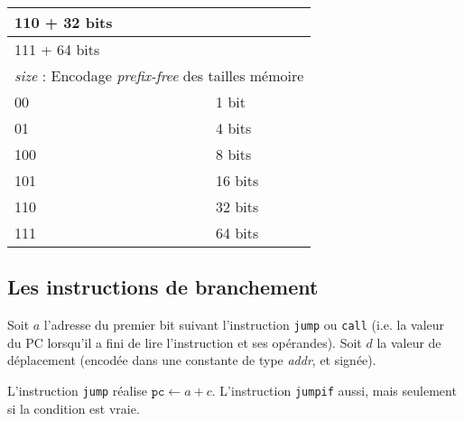 \documentclass[architecture]{compas2018}
\begin{document}
\begin{table}
\begin{tabular}{|l|l|}
    \hline
    110 + 32 bits &                                                                                \\
    \hline
    111 + 64 bits &                                                                                \\
    \hline
    \hline
    \multicolumn{2}{|c|}{\textit{size} : Encodage \emph{prefix-free} des tailles mémoire}          \\
    \hline
    00            & 1 bit                                                                          \\
    \hline
    01            & 4 bits                                                                         \\
    \hline
    100           & 8 bits                                                                         \\
    \hline
    101           & 16 bits                                                                        \\
    \hline
    110           & 32 bits                                                                        \\
    \hline
    111           & 64 bits                                                                        \\
    \hline
  \end{tabular}
\end{table}



\subsection{Les instructions de branchement }
\label{sec:jumpcallret}

Soit $a$ l'adresse du premier bit suivant l'instruction \texttt{jump} ou \texttt{call} (i.e. la valeur du PC lorsqu'il a fini de lire l'instruction et ses opérandes).
Soit $d$ la valeur de déplacement (encodée dans une constante de type \textit{addr}, et signée).

L'instruction \texttt{jump} réalise $\mathtt{pc}\leftarrow a + c$.
L'instruction \texttt{jumpif} aussi, mais seulement si la condition est vraie.
\end{document}
